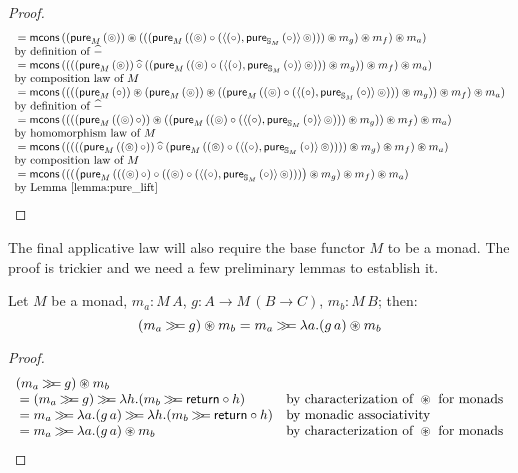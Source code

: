 \begin{lemma}
\begin{proof}
$$\begin{array}{ll}
{}= \mathsf{mcons}\, ( (\mathsf{pure}_M\,(\circledcirc)) \circledast (((\mathsf{pure}_M\,((\circledcirc) \circ (\langle (\circ), \mathsf{pure}_{\mathbb{S}_{M}}\,(\circ) \rangle\, \circledcirc))) \circledast m_g) \circledast m_f) \circledast m_a)\\
\mbox{by definition of }\mathbin{\widehat{-}}\\
{}= \mathsf{mcons}\, ( ( ((\mathsf{pure}_M\,(\circledcirc)) \mathbin{\widehat{\circ}} ((\mathsf{pure}_M\,((\circledcirc) \circ (\langle (\circ), \mathsf{pure}_{\mathbb{S}_{M}}\,(\circ) \rangle\, \circledcirc))) \circledast m_g)) \circledast m_f) \circledast m_a) \\
\mbox{by composition law of }M\\
{}= \mathsf{mcons}\, ( ( ( (\mathsf{pure}_M\,(\circ)) \circledast (\mathsf{pure}_M\,(\circledcirc)) \circledast ((\mathsf{pure}_M\,((\circledcirc) \circ (\langle (\circ), \mathsf{pure}_{\mathbb{S}_{M}}\,(\circ) \rangle\, \circledcirc))) \circledast m_g)) \circledast m_f) \circledast m_a) \\
\mbox{by definition of }\mathbin{\widehat{-}}\\
{}= \mathsf{mcons}\, ( ( ( (\mathsf{pure}_M\,((\circledcirc)\, \circ)) \circledast ((\mathsf{pure}_M\,((\circledcirc) \circ (\langle (\circ), \mathsf{pure}_{\mathbb{S}_{M}}\,(\circ) \rangle\, \circledcirc))) \circledast m_g) ) \circledast m_f) \circledast m_a) \\
 \mbox{by homomorphism law of }M\\
 {}= \mathsf{mcons}\, ( ( ( ( (\mathsf{pure}_M\,((\circledcirc)\, \circ)) \mathbin{\widehat{\circ}} (\mathsf{pure}_M\,((\circledcirc) \circ (\langle (\circ), \mathsf{pure}_{\mathbb{S}_{M}}\,(\circ) \rangle\, \circledcirc)))  ) \circledast m_g ) \circledast m_f) \circledast m_a) \\
\mbox{by composition law of }M\\
 {}= \mathsf{mcons}\, ( ( ( \big(\mathsf{pure}_M\,(((\circledcirc)\, \circ) \circ ((\circledcirc) \circ (\langle (\circ), \mathsf{pure}_{\mathbb{S}_{M}}\,(\circ) \rangle\, \circledcirc)))\big) \circledast m_g ) \circledast m_f) \circledast m_a) \\
\mbox{by Lemma \ref{lemma:pure_lift}}\\
\end{array}
$$
\end{proof}
\end{lemma}


The final applicative law will also require the base functor $M$ to be a monad.
The proof is trickier and we need a few preliminary lemmas to establish it.
\begin{lemma}\label{lemma:bind_appl}
Let $M$ be a monad, $m_a:M\,A$, $g:A \rightarrow M\,(B\rightarrow C)$, $m_b:M\,B$; then:
$$
(m_a \mathbin{\gg\!\!=} g) \circledast m_b = m_a \mathbin{\gg\!\!=} \lambda a. (g\,a) \circledast m_b
$$
\end{lemma}
\begin{proof}
$$
\begin{array}{ll}
(m_a \bind g) \appl m_b \\
{}= (m_a \bind g) \bind \lambda h. (m_b \bind \return \comp h)
  & \mbox{by characterization of }\appl\mbox{ for monads}\\
{}= m_a \bind \lambda a. (g\,a) \bind \lambda h. (m_b \bind \return \comp h)
  & \mbox{by monadic associativity}\\
{}= m_a \bind \lambda a. (g\,a) \appl m_b
  & \mbox{by characterization of }\appl\mbox{ for monads}\\  
\end{array}
$$
\end{proof}

